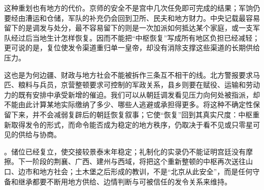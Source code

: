 这种重划也有地方的代价。京师的安全不是宫中几次任免即可完成的结果；军饷仍要经由漕运和仓储，军队的补充仍会回到卫所、民夫和地方财力。中央记载最容易留下的是调发与处分，最不容易留下的则是一次加派如何抵达某个家庭，或一支军队经过后当地生计怎样恢复。因而不能把“中枢恢复”写成所有地区负担已经减轻；更可说的是，复位使发令渠道重归单一皇帝，却没有消除支撑这些渠道的长期供给压力。

这也是为何边疆、财政与地方社会不能被拆作三条互不相干的线。北方警报要求马匹、粮料与兵员，京营整顿要求可控制的军政关系，县乡则要在赋役、运输和劳动力的既有安排中承受新增的催迫。我们可以从朝廷调发看见压力向何处被指派，却不能由此计算某地实际缴纳了多少、哪些人逃避或承担得更多。将这种不确定性保留下来，并不会减弱复辟后的朝廷恢复叙事；它使“恢复”回到其真实尺度：中枢重新取得发令的形式，而命令能否成为稳定的地方秩序，仍取决于看不见或只零星可见的供给与协商。

。储位已经复立，使交接较景泰末年稳定；礼制化的实录仍不能证明宫廷没有摩擦。下一阶段的荆襄、广西、建州与西域，将把这个重新整顿的中枢再次送往山口、边市和地方社会；土木堡之后形成的教训，不是“北京从此安全”，而是任何守备和继承都要不断用地方供给、边情判断与可被信任的发令关系来维持。
